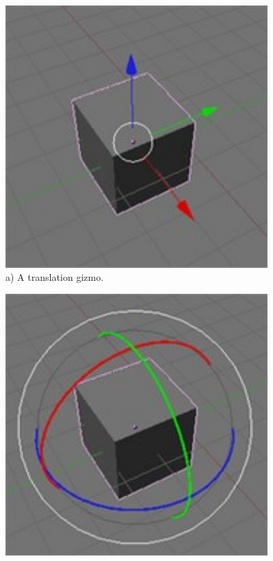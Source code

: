 \begin{figure}[htbp]
  \begin{minipage}{.5\textwidth}
    \centering
    \includegraphics[width=0.9\textwidth]{../assets/Manual-Manipulators-Translate.jpg}\\
  	a) A translation gizmo. \cite{blenderwiki}
  \end{minipage}
  \begin{minipage}{.5\textwidth}
    \centering
    \includegraphics[width=0.9\textwidth]{../assets/Manual-Manipulators-Rotate.jpg}\\

\end{minipage}
\end{figure}
